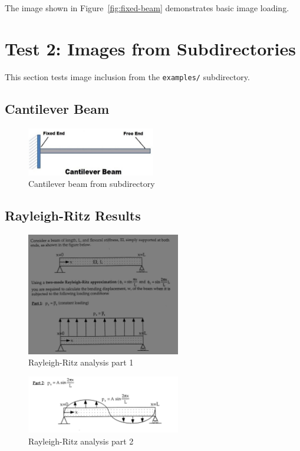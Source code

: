 \documentclass[12pt]{article}
\begin{document}
The image shown in Figure~\ref{fig:fixed-beam} demonstrates basic image loading.

\section{Test 2: Images from Subdirectories}

This section tests image inclusion from the \texttt{examples/} subdirectory.

\subsection{Cantilever Beam}

\begin{figure}[ht]
    \centering
    \includegraphics[width=0.5\textwidth]{examples/Cantilever Beam Image.png}
    \caption{Cantilever beam from subdirectory}
    \label{fig:cantilever}
\end{figure}

\subsection{Rayleigh-Ritz Results}

\begin{figure}[ht]
    \centering
    \includegraphics[width=0.6\textwidth]{examples/Rayleigh-Ritz part1.png}
    \caption{Rayleigh-Ritz analysis part 1}
    \label{fig:rayleigh1}
\end{figure}

\begin{figure}[ht]
    \centering
    \includegraphics[width=0.6\textwidth]{examples/Rayleigh-Ritz part2.png}
    \caption{Rayleigh-Ritz analysis part 2}
    \label{fig:rayleigh2}
\end{figure}
\end{document}
